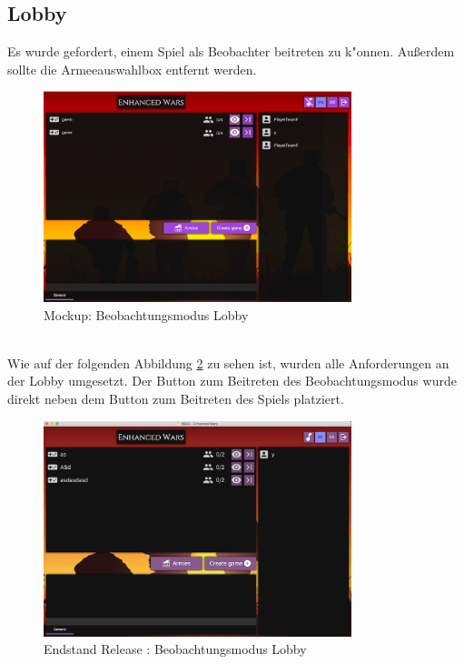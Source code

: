 \documentclass[12pt, titlepage]{scrartcl}
\newcommand{\RN}[1]{%
	\textup{\uppercase\expandafter{\romannumeral#1}}%
}
\begin{document}
		\subsection{Lobby}
			Es wurde gefordert, einem Spiel als Beobachter beitreten zu k"onnen. Au{\ss}erdem sollte die Armeeauswahlbox entfernt werden.
			\begin{figure}[H] 
				\centering
				\includegraphics[width=0.8\textwidth]{images/mockups/LobbyWatchMode.png}
				\caption{Mockup: Beobachtungsmodus Lobby}
				\label{Watch_Mode_2}
			\end{figure}
	\newpage
			\ \\ Wie auf der folgenden Abbildung \ref{End_Watch_Mode} zu sehen ist, wurden alle Anforderungen an der Lobby umgesetzt. Der Button zum Beitreten des Beobachtungsmodus wurde direkt neben dem Button zum Beitreten des Spiels platziert.
			\begin{figure}[H] 
				\centering
				\includegraphics[width=0.8\textwidth]{images/endOfRelease/LobbyWatchMode.png}
				\caption{Endstand Release \RN{3}: Beobachtungsmodus Lobby}
				\label{End_Watch_Mode}
			\end{figure}
\end{document}
